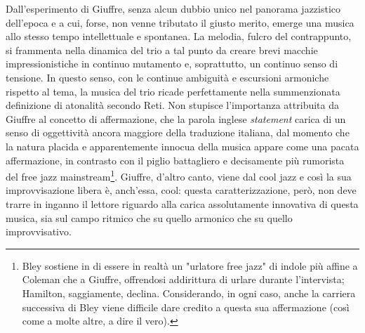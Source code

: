  Dall'esperimento di Giuffre, senza alcun dubbio unico nel panorama jazzistico dell'epoca e a cui, forse, non venne tributato il giusto merito, emerge una musica allo stesso tempo intellettuale e spontanea. La melodia, fulcro del contrappunto, si frammenta nella dinamica del trio a tal punto da creare brevi macchie impressionistiche in continuo mutamento e, soprattutto, un continuo senso di tensione. In questo senso, con le continue ambiguità e escursioni armoniche rispetto al tema, la musica del trio ricade perfettamente nella summenzionata definizione di atonalità secondo Reti. Non stupisce l'importanza attribuita da Giuffre al concetto di affermazione, che la parola inglese \textit{statement} carica di un senso di oggettività ancora maggiore della traduzione italiana, dal momento che la natura placida e apparentemente innocua della musica appare come una pacata affermazione, in contrasto con il piglio battagliero e decisamente più rumorista del free jazz mainstream\footnote{Bley sostiene in \cite{hamilton} di essere in realtà un "urlatore free jazz" di indole più affine a Coleman che a Giuffre, offrendosi addirittura di urlare durante l'intervista; Hamilton, saggiamente, declina. Considerando, in ogni caso, anche la carriera successiva di Bley viene difficile dare credito a questa sua affermazione (così come a molte altre, a dire il vero).}. Giuffre, d'altro canto, viene dal cool jazz e così la sua improvvisazione libera è, anch'essa, cool: questa caratterizzazione, però, non deve trarre in inganno il lettore riguardo alla carica assolutamente innovativa di questa musica, sia sul campo ritmico che su quello armonico che su quello improvvisativo.
 
